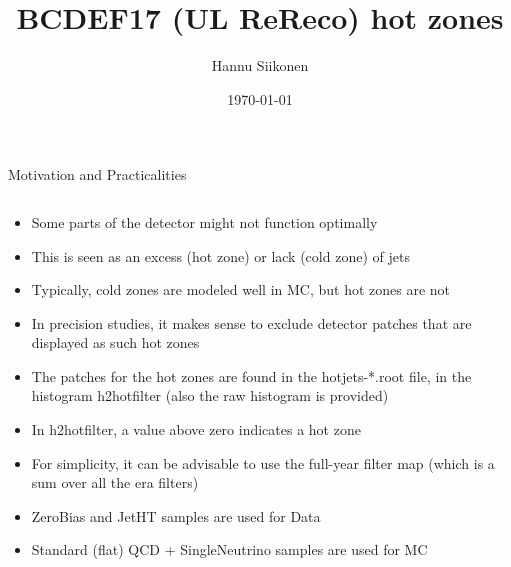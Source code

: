 \documentclass[9pt]{beamer}
\title[BCDEF17 (UL ReReco) hot zones]{BCDEF17 (UL ReReco) hot zones}
\author{Hannu Siikonen}
\institute{Helsinki Institute of Physics \\ \vspace{0.25cm} Instructor Adj.~Prof.~Mikko~Voutilainen}
\date{\today}
\begin{document}
\begin{frame}[t]
\titlepage
\end{frame}

\begin{frame}[t]{Motivation and Practicalities}
\begin{columns}[T]
\begin{column}{\textwidth}
\begin{itemize}
 \item Some parts of the detector might not function optimally
 \item This is seen as an excess (hot zone) or lack (cold zone) of jets
 \item Typically, cold zones are modeled well in MC, but hot zones are not
 \item In precision studies, it makes sense to exclude detector patches that are displayed as such hot zones
 \item The patches for the hot zones are found in the hotjets-*.root file, in the histogram h2hotfilter (also the raw histogram is provided)
 \item In h2hotfilter, a value above zero indicates a hot zone
 \item For simplicity, it can be advisable to use the full-year filter map (which is a sum over all the era filters)
 \item ZeroBias and JetHT samples are used for Data
 \item Standard (flat) QCD + SingleNeutrino samples are used for MC
\end{itemize}
\end{column}
\end{columns}
\end{frame}
\end{document}
